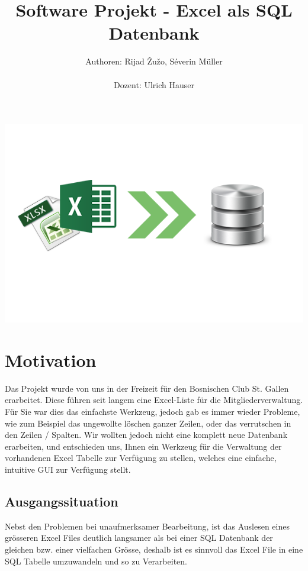 \documentclass{article}
\begin{document}

\title{Software Projekt - Excel als SQL Datenbank}
\author{Authoren: Rijad \v{Z}u\v{z}o, Séverin Müller \\ \\ Dozent: Ulrich Hauser}

\maketitle

\vspace{80mm}
\begin{center}
		\includegraphics{SoftwareLogo}
\end{center}

\newpage
\tableofcontents
\newpage


\section{Motivation}
Das Projekt wurde von uns in der Freizeit für den Bosnischen Club St. Gallen erarbeitet. Diese führen seit langem eine Excel-Liste für die Mitgliederverwaltung. \newline 
Für Sie war dies das einfachste Werkzeug, jedoch gab es immer wieder Probleme, wie zum Beispiel das ungewollte löschen ganzer Zeilen, oder das verrutschen in den Zeilen / Spalten. Wir wollten jedoch nicht eine komplett neue Datenbank erarbeiten, und entschieden uns, Ihnen ein Werkzeug für die Verwaltung der vorhandenen Excel Tabelle zur Verfügung zu stellen, welches eine einfache, intuitive GUI zur Verfügung stellt.

\subsection{Ausgangssituation}
Nebst den Problemen bei unaufmerksamer Bearbeitung, ist das Auslesen eines grösseren Excel Files deutlich langsamer als bei einer SQL Datenbank der gleichen bzw. einer vielfachen Grösse, deshalb ist es sinnvoll das Excel File in eine SQL Tabelle umzuwandeln und so zu Verarbeiten. \newline 
\end{document}
